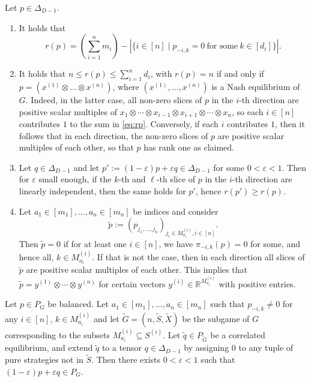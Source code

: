 \documentclass[10pt,a4paper]{amsart}
\newcommand{\RR}{{\mathbb R}}
\renewcommand{\tilde}[1]{\widetilde{#1}}
\begin{document}
\begin{remark}
\label{RemarkR}
Let $p \in \Delta_{D-1}$.
\begin{enumerate}
    \item It holds that \[r(p) = \left( \sum_{i=1}^n m_i \right) - |\{i \in [n] \mid p_{-i,k}=0 \ \text{for some} \ k \in [d_i]   \}  |.  \]
    \item It holds that $n \leq r(p) \leq \sum_{i=1}^n d_i$, with
    $r(p)=n$ if and only if $p=(x^{(1)} \otimes \dots \otimes
    x^{(n)})$, where $(x^{(1)}, \dots, x^{(n)})$ is a Nash equilibrium
    of $G$. Indeed, in the latter case, all non-zero slices of $p$ in
    the $i$-th direction are positive scalar multiples of $x_1 \otimes
    \cdots \otimes x_{i-1} \otimes x_{i+1} \otimes \cdots \otimes x_n$, so each $i \in [n]$
    contributes $1$ to the sum in \eqref{eq:rp}. Conversely, if each $i$
    contributes $1$, then it follows that in each direction, the
    non-zero slices of $p$ are positive scalar multiples of each other,
    so that $p$ has rank one as claimed. 
    \item Let $q \in \Delta_{D-1}$ and let $p':=(1- \varepsilon)p +
    \varepsilon q \in \Delta_{D-1}$ for some $0< \varepsilon <1$.
    Then for $\varepsilon$ small enough, if the $k$-th and $\ell$-th
    slice of $p$ in the $i$-th direction are linearly independent, then 
    the same holds for $p'$, hence $r(p') \geq r(p)$. 
    \item Let $a_1 \in [m_1], \dots, a_n \in [m_n]$ be indices and
    consider \[ \tilde{p}:=(p_{j_1, \dots, j_n})_{j_i \in
    M^{(i)}_{a_i}, i \in [n]}.\] Then $\tilde{p}=0$ if 
    for at least one $i \in [n]$, we have $\pi_{-i,k}(p)=0$ for some,
    and hence all, $k \in M_{a_i}^{(i)}$. If that is not the case,
    then in each direction all slices of $\tilde{p}$ 
    are positive scalar multiples of each other. This implies
    that $\tilde{p}=y^{(1)} \otimes \cdots \otimes y^{(n)}$ for
    certain vectors $y^{(i)} \in \RR^{M^{(i)}_{a_i}}$ with 
    positive entries. 
\end{enumerate}
\end{remark}

\begin{lemma}
\label{LemmaSubgameAdd}
Let $p \in P_G$ be balanced. Let $a_1 \in [m_1], \dots, a_n \in [m_n]$ such that $p_{-i,k} \neq 0$ for any $i \in [n]$, $k \in M^{(i)}_{a_i}$ and
let $\tilde{G}=(n,\tilde{S},\tilde{X})$ be the subgame of $G$
corresponding to the subsets $M_{a_i}^{(i)} \subseteq S^{(i)}$. Let
$\tilde{q} \in P_{\tilde{G}}$ be a correlated equilibrium, and extend
$\tilde{q}$ to a tensor $q \in \Delta_{D-1}$ by assigning $0$ to any
tuple of pure strategies not in $\tilde{S}$. Then there exists $0<\varepsilon<1$
such that $(1-\varepsilon)p + \varepsilon q \in P_G$.
\end{lemma}
\end{document}
